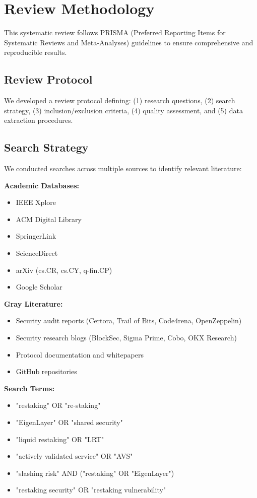 \documentclass[runningheads]{llncs}
\begin{document}
\vspace{-0.3cm}
\section{Review Methodology}
\label{sec:methodology}

This systematic review follows PRISMA (Preferred Reporting Items for Systematic Reviews and Meta-Analyses) guidelines to ensure comprehensive and reproducible results.

\subsection{Review Protocol}

We developed a review protocol defining: (1) research questions, (2) search strategy, (3) inclusion/exclusion criteria, (4) quality assessment, and (5) data extraction procedures.

\subsection{Search Strategy}

We conducted searches across multiple sources to identify relevant literature:

\textbf{Academic Databases:}
\begin{itemize}
    \item IEEE Xplore
    \item ACM Digital Library
    \item SpringerLink
    \item ScienceDirect
    \item arXiv (cs.CR, cs.CY, q-fin.CP)
    \item Google Scholar
\end{itemize}

\textbf{Gray Literature:}
\begin{itemize}
    \item Security audit reports (Certora, Trail of Bits, Code4rena, OpenZeppelin)
    \item Security research blogs (BlockSec, Sigma Prime, Cobo, OKX Research)
    \item Protocol documentation and whitepapers
    \item GitHub repositories
\end{itemize}

\textbf{Search Terms:}
\begin{itemize}
    \item "restaking" OR "re-staking"
    \item "EigenLayer" OR "shared security"
    \item "liquid restaking" OR "LRT"
    \item "actively validated service" OR "AVS"
    \item "slashing risk" AND ("restaking" OR "EigenLayer")
    \item "restaking security" OR "restaking vulnerability"
\end{itemize}
\end{document}
